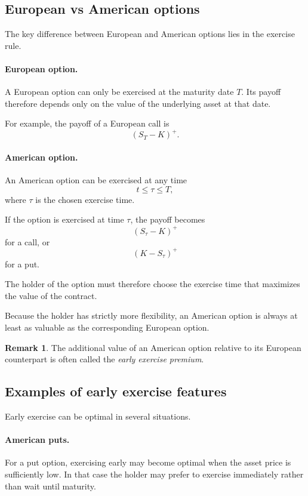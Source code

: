 \documentclass[11pt]{article}
\theoremstyle{definition}
\newtheorem{remark}{Remark}
\theoremstyle{plain}
\begin{document}
\subsection{European vs American options}

The key difference between European and American options lies in the
exercise rule.

\paragraph{European option.}
A European option can only be exercised at the maturity date \(T\).
Its payoff therefore depends only on the value of the underlying asset
at that date.

For example, the payoff of a European call is
\[
(S_T-K)^+.
\]

\paragraph{American option.}
An American option can be exercised at any time
\[
t \le \tau \le T,
\]
where \(\tau\) is the chosen exercise time.

If the option is exercised at time \(\tau\), the payoff becomes
\[
(S_\tau-K)^+
\]
for a call, or
\[
(K-S_\tau)^+
\]
for a put.

The holder of the option must therefore choose the exercise time
that maximizes the value of the contract.

\medskip

Because the holder has strictly more flexibility, an American option
is always at least as valuable as the corresponding European option.

\begin{remark}
The additional value of an American option relative to its European
counterpart is often called the \emph{early exercise premium}.
\end{remark}


\subsection{Examples of early exercise features}

Early exercise can be optimal in several situations.

\paragraph{American puts.}
For a put option, exercising early may become optimal when the asset
price is sufficiently low.
In that case the holder may prefer to exercise immediately rather than
wait until maturity.
\end{document}
